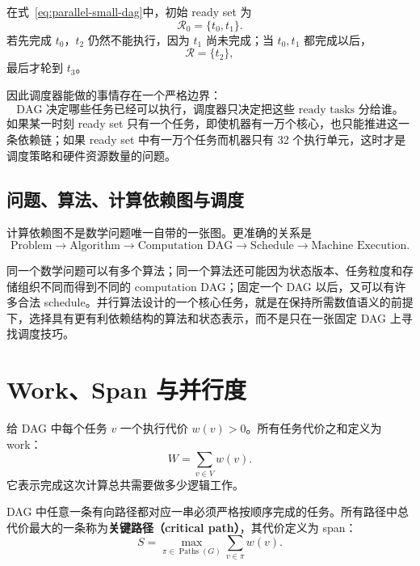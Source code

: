 在式~\eqref{eq:parallel-small-dag}中，初始 ready set 为
\begin{equation}
\mathcal R_0=\{t_0,t_1\}.
\end{equation}
若先完成 $t_0$，$t_2$ 仍然不能执行，因为 $t_1$ 尚未完成；当 $t_0,t_1$ 都完成以后，
\begin{equation}
\mathcal R=\{t_2\},
\end{equation}
最后才轮到 $t_3$。

因此调度器能做的事情存在一个严格边界：
\begin{equation}
\boxed{
\text{DAG 决定哪些任务已经可以执行，调度器只决定把这些 ready tasks 分给谁。}
}
\label{eq:parallel-dag-vs-scheduler}
\end{equation}
如果某一时刻 ready set 只有一个任务，即使机器有一万个核心，也只能推进这一条依赖链；如果 ready set 中有一万个任务而机器只有 32 个执行单元，这时才是调度策略和硬件资源数量的问题。

\subsection{问题、算法、计算依赖图与调度}

计算依赖图不是数学问题唯一自带的一张图。更准确的关系是
\begin{equation}
\boxed{
\text{Problem}
\rightarrow
\text{Algorithm}
\rightarrow
\text{Computation DAG}
\rightarrow
\text{Schedule}
\rightarrow
\text{Machine Execution}.
}
\label{eq:parallel-problem-algorithm-dag}
\end{equation}

同一个数学问题可以有多个算法；同一个算法还可能因为状态版本、任务粒度和存储组织不同而得到不同的 computation DAG；固定一个 DAG 以后，又可以有许多合法 schedule。并行算法设计的一个核心任务，就是在保持所需数值语义的前提下，选择具有更有利依赖结构的算法和状态表示，而不是只在一张固定 DAG 上寻找调度技巧。

\section{Work、Span 与并行度}

给 DAG 中每个任务 $v$ 一个执行代价 $w(v)>0$。所有任务代价之和定义为 work：
\begin{equation}
\boxed{
W=\sum_{v\in V}w(v).
}
\label{eq:parallel-work}
\end{equation}
它表示完成这次计算总共需要做多少逻辑工作。

DAG 中任意一条有向路径都对应一串必须严格按顺序完成的任务。所有路径中总代价最大的一条称为\textbf{关键路径（critical path）}，其代价定义为 span：
\begin{equation}
\boxed{
S=
\max_{\pi\in\operatorname{Paths}(G)}
\sum_{v\in\pi}w(v).
}
\label{eq:parallel-span}
\end{equation}

